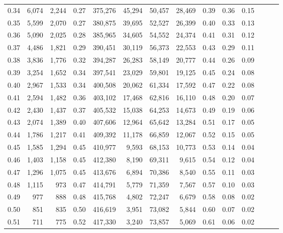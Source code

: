\begin{tabular}{rrrrrrrrrrrrrr}
0.34 &   6,074 &  2,244 &  0.27 &  375,276 &   45,294 &  50,457 &  28,469 &  0.39 &  0.36 &      0.15 \\
0.35 &   5,599 &  2,070 &  0.27 &  380,875 &   39,695 &  52,527 &  26,399 &  0.40 &  0.33 &      0.13 \\
0.36 &   5,090 &  2,025 &  0.28 &  385,965 &   34,605 &  54,552 &  24,374 &  0.41 &  0.31 &      0.12 \\
0.37 &   4,486 &  1,821 &  0.29 &  390,451 &   30,119 &  56,373 &  22,553 &  0.43 &  0.29 &      0.11 \\
0.38 &   3,836 &  1,776 &  0.32 &  394,287 &   26,283 &  58,149 &  20,777 &  0.44 &  0.26 &      0.09 \\
0.39 &   3,254 &  1,652 &  0.34 &  397,541 &   23,029 &  59,801 &  19,125 &  0.45 &  0.24 &      0.08 \\
0.40 &   2,967 &  1,533 &  0.34 &  400,508 &   20,062 &  61,334 &  17,592 &  0.47 &  0.22 &      0.08 \\
0.41 &   2,594 &  1,482 &  0.36 &  403,102 &   17,468 &  62,816 &  16,110 &  0.48 &  0.20 &      0.07 \\
0.42 &   2,430 &  1,437 &  0.37 &  405,532 &   15,038 &  64,253 &  14,673 &  0.49 &  0.19 &      0.06 \\
0.43 &   2,074 &  1,389 &  0.40 &  407,606 &   12,964 &  65,642 &  13,284 &  0.51 &  0.17 &      0.05 \\
0.44 &   1,786 &  1,217 &  0.41 &  409,392 &   11,178 &  66,859 &  12,067 &  0.52 &  0.15 &      0.05 \\
0.45 &   1,585 &  1,294 &  0.45 &  410,977 &    9,593 &  68,153 &  10,773 &  0.53 &  0.14 &      0.04 \\
0.46 &   1,403 &  1,158 &  0.45 &  412,380 &    8,190 &  69,311 &   9,615 &  0.54 &  0.12 &      0.04 \\
0.47 &   1,296 &  1,075 &  0.45 &  413,676 &    6,894 &  70,386 &   8,540 &  0.55 &  0.11 &      0.03 \\
0.48 &   1,115 &    973 &  0.47 &  414,791 &    5,779 &  71,359 &   7,567 &  0.57 &  0.10 &      0.03 \\
0.49 &     977 &    888 &  0.48 &  415,768 &    4,802 &  72,247 &   6,679 &  0.58 &  0.08 &      0.02 \\
0.50 &     851 &    835 &  0.50 &  416,619 &    3,951 &  73,082 &   5,844 &  0.60 &  0.07 &      0.02 \\
0.51 &     711 &    775 &  0.52 &  417,330 &    3,240 &  73,857 &   5,069 &  0.61 &  0.06 &      0.02 \\

\end{tabular}
